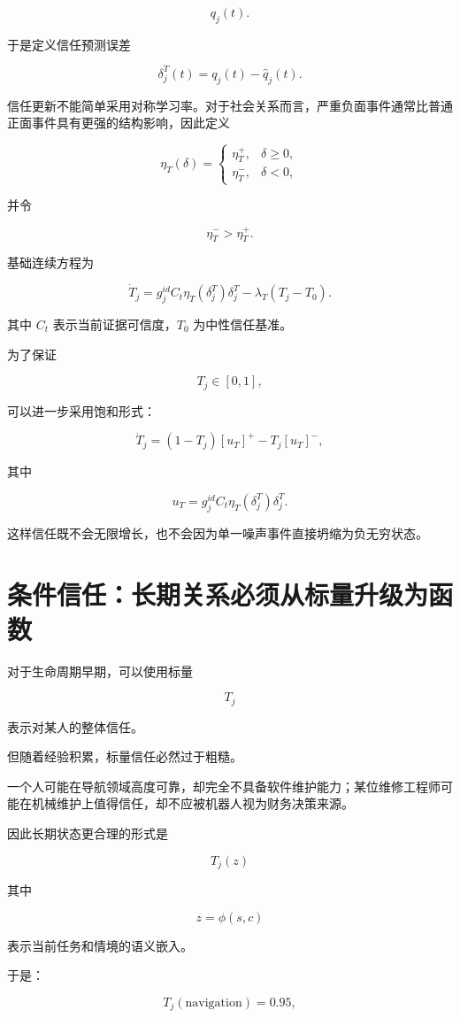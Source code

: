 \[
q_j(t).
\]

于是定义信任预测误差

\[
\delta_j^T(t)
=
q_j(t)-\hat q_j(t).
\]

信任更新不能简单采用对称学习率。对于社会关系而言，严重负面事件通常比普通正面事件具有更强的结构影响，因此定义

\[
\eta_T(\delta)
=
\begin{cases}
\eta_T^+,
&
\delta\ge0,
\\
\eta_T^-,
&
\delta<0,
\end{cases}
\]

并令

\[
\eta_T^->\eta_T^+.
\]

基础连续方程为

\[
\dot T_j
=
g_j^{id}
C_t
\eta_T(\delta_j^T)
\delta_j^T
-
\lambda_T
(T_j-T_0).
\]

其中 $C_t$ 表示当前证据可信度，$T_0$ 为中性信任基准。

为了保证

\[
T_j\in[0,1],
\]

可以进一步采用饱和形式：

\[
\boxed{
\dot T_j
=
(1-T_j)
[u_T]^+
-
T_j
[u_T]^-,
}
\]

其中

\[
u_T
=
g_j^{id}
C_t
\eta_T(\delta_j^T)
\delta_j^T.
\]

这样信任既不会无限增长，也不会因为单一噪声事件直接坍缩为负无穷状态。


\section{条件信任：长期关系必须从标量升级为函数}

对于生命周期早期，可以使用标量

\[
T_j
\]

表示对某人的整体信任。

但随着经验积累，标量信任必然过于粗糙。

一个人可能在导航领域高度可靠，却完全不具备软件维护能力；某位维修工程师可能在机械维护上值得信任，却不应被机器人视为财务决策来源。

因此长期状态更合理的形式是

\[
\boxed{
T_j(z)
}
\]

其中

\[
z=\phi(s,c)
\]

表示当前任务和情境的语义嵌入。

于是：

\[
T_j(\mathrm{navigation})=0.95,
\]

